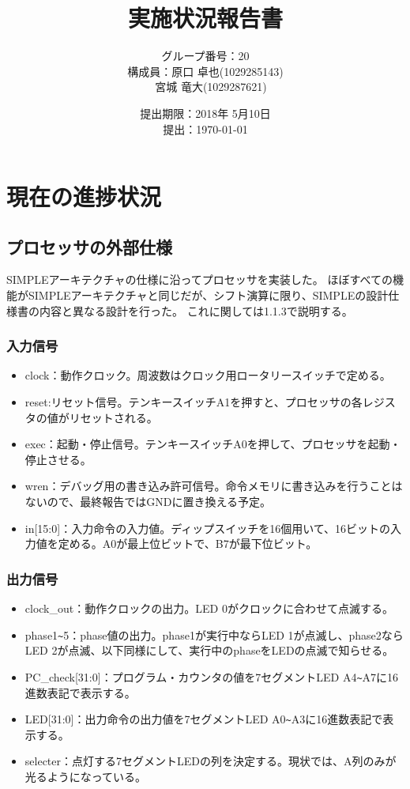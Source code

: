 \documentclass[titlepage]{jsarticle}
\title{実施状況報告書}
\author{グループ番号：20　\\ 構成員：原口 卓也(1029285143)　\\　宮城 竜大(1029287621)}
\date{提出期限：2018年 5月10日　\\ 提出：\today}
\begin{document}
\maketitle
\section{現在の進捗状況}
\subsection{プロセッサの外部仕様}

SIMPLEアーキテクチャの仕様に沿ってプロセッサを実装した。
ほぼすべての機能がSIMPLEアーキテクチャと同じだが、シフト演算に限り、SIMPLEの設計仕様書の内容と異なる設計を行った。
これに関しては1.1.3で説明する。

\subsubsection{入力信号}

\begin{itemize}
\item clock：動作クロック。周波数はクロック用ロータリースイッチで定める。
\item reset:リセット信号。テンキースイッチA1を押すと、プロセッサの各レジスタの値がリセットされる。
\item exec：起動・停止信号。テンキースイッチA0を押して、プロセッサを起動・停止させる。
\item wren：デバッグ用の書き込み許可信号。命令メモリに書き込みを行うことはないので、最終報告ではGNDに置き換える予定。
\item in[15:0]：入力命令の入力値。ディップスイッチを16個用いて、16ビットの入力値を定める。A0が最上位ビットで、B7が最下位ビット。
\end{itemize}

\subsubsection{出力信号}

\begin{itemize}
\item clock\_out：動作クロックの出力。LED 0がクロックに合わせて点滅する。
\item phase1\verb|~|5：phase値の出力。phase1が実行中ならLED 1が点滅し、phase2ならLED 2が点滅、以下同様にして、実行中のphaseをLEDの点滅で知らせる。
\item PC\_check[31:0]：プログラム・カウンタの値を7セグメントLED A4\verb|~|A7に16進数表記で表示する。
\item LED[31:0]：出力命令の出力値を7セグメントLED A0\verb|~|A3に16進数表記で表示する。
\item selecter：点灯する7セグメントLEDの列を決定する。現状では、A列のみが光るようになっている。
\end{itemize}
\end{document}
